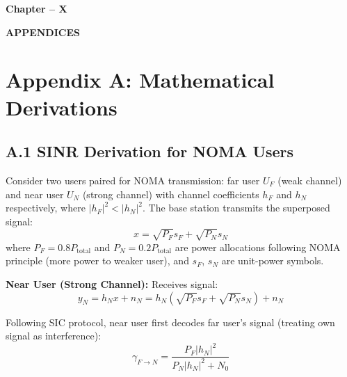 \documentclass[12pt,a4paper]{article}
\begin{document}
\clearpage

\begin{center}
    \vspace*{10cm}
    
    {\fontsize{16}{19.2}\selectfont\bfseries
    Chapter -- X}
    
    \vspace{1cm}
    
    {\fontsize{16}{19.2}\selectfont\bfseries
    APPENDICES}
    
    \vspace*{\fill}
\end{center}

\thispagestyle{plain}

\clearpage

\section*{Appendix A: Mathematical Derivations}

\subsection*{A.1 SINR Derivation for NOMA Users}

Consider two users paired for NOMA transmission: far user $U_F$ (weak channel) and near user $U_N$ (strong channel) with channel coefficients $h_F$ and $h_N$ respectively, where $|h_F|^2 < |h_N|^2$. The base station transmits the superposed signal:
\begin{equation}
x = \sqrt{P_F} s_F + \sqrt{P_N} s_N
\end{equation}
where $P_F = 0.8P_{\text{total}}$ and $P_N = 0.2P_{\text{total}}$ are power allocations following NOMA principle (more power to weaker user), and $s_F$, $s_N$ are unit-power symbols.

\textbf{Near User (Strong Channel):} Receives signal:
\begin{equation}
y_N = h_N x + n_N = h_N(\sqrt{P_F} s_F + \sqrt{P_N} s_N) + n_N
\end{equation}

Following SIC protocol, near user first decodes far user's signal (treating own signal as interference):
\begin{equation}
\gamma_{F \rightarrow N} = \frac{P_F |h_N|^2}{P_N |h_N|^2 + N_0}
\end{equation}
\end{document}
